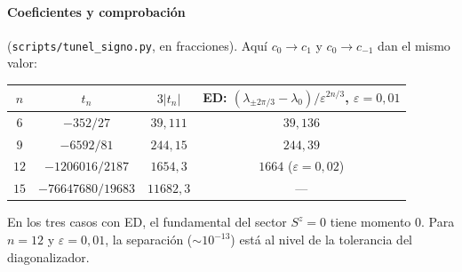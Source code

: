 \documentclass[11pt,a4paper]{article}
\theoremstyle{definition}
\theoremstyle{remark}
\newcommand{\eps}{\varepsilon}
\newcommand{\scr}[1]{\texttt{scripts/#1}}
\begin{document}
\paragraph{Coeficientes y comprobación} (\scr{tunel\_signo.py}, en fracciones). Aquí $c_0\to c_1$ y
$c_0\to c_{-1}$ dan el mismo valor:

\begin{center}
\begin{tabular}{cccc}
\toprule
$n$ & $t_n$ & $3|t_n|$ & ED: $(\lambda_{\pm2\pi/3}-\lambda_0)/\eps^{2n/3}$, $\eps=0{,}01$\\
\midrule
$6$ & $-352/27$ & $39{,}111$ & $39{,}136$\\
$9$ & $-6592/81$ & $244{,}15$ & $244{,}39$\\
$12$ & $-1206016/2187$ & $1654{,}3$ & $1664$ ($\eps=0{,}02$)\\
$15$ & $-76647680/19683$ & $11682{,}3$ & ---\\
\bottomrule
\end{tabular}
\end{center}

\noindent
En los tres casos con ED, el fundamental del sector $S^z=0$ tiene momento $0$. Para $n=12$ y $\eps=0{,}01$,
la separación ($\sim10^{-13}$) está al nivel de la tolerancia del diagonalizador.
\end{document}
